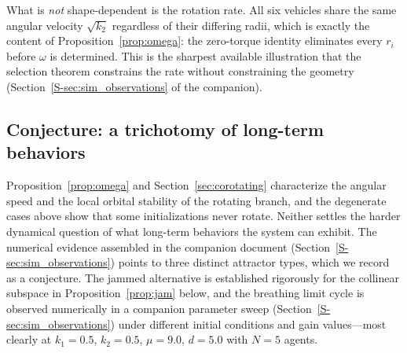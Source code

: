 What is \emph{not} shape-dependent is the rotation rate. All six vehicles share the same angular
velocity $\sqrt{k_2}$ regardless of their differing radii, which is exactly the content of
Proposition~\ref{prop:omega}: the zero-torque identity eliminates every $r_i$ before $\omega$ is
determined. This is the sharpest available illustration that the selection theorem constrains the rate
without constraining the geometry (Section~\ref{S-sec:sim_observations} of the companion).

\subsection{Conjecture: a trichotomy of long-term behaviors}
\label{sec:dist_conjecture}

Proposition~\ref{prop:omega} and Section~\ref{sec:corotating} characterize the angular speed and the
local orbital stability of the rotating branch, and the degenerate cases above show that some
initializations never rotate. Neither settles the harder dynamical question of what long-term
behaviors the system can exhibit. The numerical evidence assembled in the companion document
(Section~\ref{S-sec:sim_observations}) points to three distinct attractor types, which we record
as a conjecture. The jammed alternative is established rigorously for the collinear subspace in
Proposition~\ref{prop:jam} below, and the breathing limit cycle is observed numerically in a
companion parameter sweep (Section~\ref{S-sec:sim_observations}) under different initial conditions
and gain values---most clearly at $k_1=0.5$, $k_2=0.5$, $\mu=9.0$, $d=5.0$ with $N=5$ agents.

